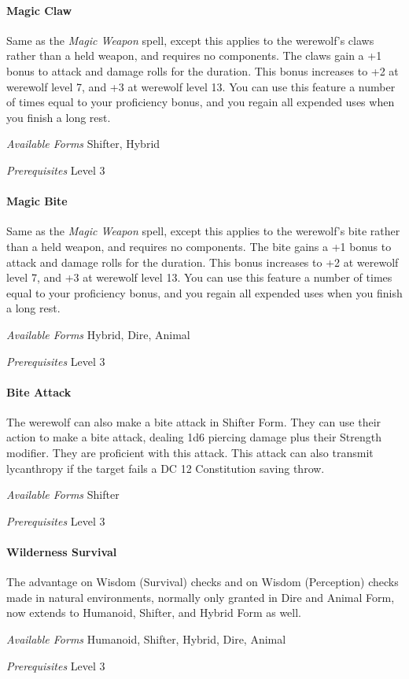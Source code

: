 \documentclass[twocolumn]{dndbook}
\begin{document}
\paragraph*{Magic Claw}
Same as the \emph{Magic Weapon} spell, except this applies to the werewolf's claws rather than a held weapon, and requires no components.
The claws gain a +1 bonus to attack and damage rolls for the duration.
This bonus increases to +2 at werewolf level 7, and +3 at werewolf level 13.
You can use this feature a number of times equal to your proficiency bonus, and you regain all expended uses when you finish a long rest.\par
\emph{Available Forms} Shifter, Hybrid\par
\emph{Prerequisites} Level 3\par

\paragraph*{Magic Bite}
Same as the \emph{Magic Weapon} spell, except this applies to the werewolf's bite rather than a held weapon, and requires no components.
The bite gains a +1 bonus to attack and damage rolls for the duration.
This bonus increases to +2 at werewolf level 7, and +3 at werewolf level 13.
You can use this feature a number of times equal to your proficiency bonus, and you regain all expended uses when you finish a long rest.\par
\emph{Available Forms} Hybrid, Dire, Animal\par
\emph{Prerequisites} Level 3\par

\paragraph*{Bite Attack}
The werewolf can also make a bite attack in Shifter Form.
They can use their action to make a bite attack, dealing 1d6 piercing damage plus their Strength modifier.
They are proficient with this attack.
This attack can also transmit lycanthropy if the target fails a DC 12 Constitution saving throw.\par
\emph{Available Forms} Shifter\par
\emph{Prerequisites} Level 3\par

\paragraph*{Wilderness Survival}
The advantage on Wisdom (Survival) checks and on Wisdom (Perception) checks made in natural environments, normally only granted in Dire and Animal Form, now extends to Humanoid, Shifter, and Hybrid Form as well.\par
\emph{Available Forms} Humanoid, Shifter, Hybrid, Dire, Animal\par
\emph{Prerequisites} Level 3\par
\end{document}
